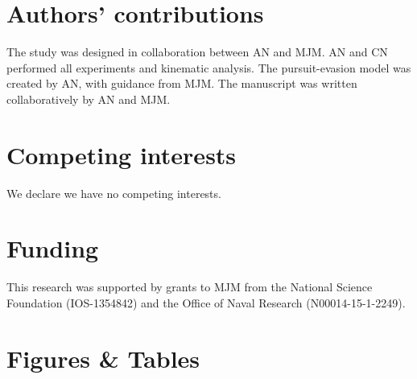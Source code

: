 \documentclass[]{rsos}%
\begin{document}
\section*{Authors' contributions}
The study was designed in collaboration between AN and MJM.
AN and CN performed all experiments and kinematic analysis.
The pursuit-evasion model was created by AN, with guidance from MJM. 
The manuscript was written collaboratively by AN and MJM.

\section*{Competing interests}
We declare we have no competing interests.

\section*{Funding}

This research was supported by grants to MJM from the National Science Foundation (IOS-1354842) and the Office of Naval Research (N00014-15-1-2249).





\linespread{1}\selectfont %



\pagebreak



\section*{Figures \& Tables}

\linespread{1.3}\selectfont %
\end{document}
